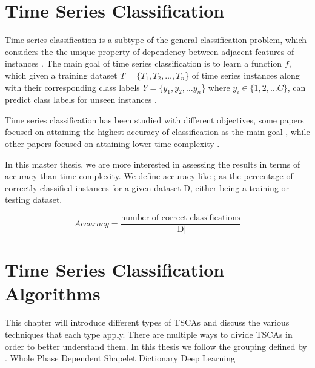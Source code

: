 \section{Time Series Classification}
\label{TimeSeriesClassification}
Time series classification is a subtype of the general classification problem, which considers the the unique property of dependency between adjacent features of instances \cite{Bostrom2017}.
The main goal of time series classification is to learn a function $f$,
which given a training dataset $T = \{T_{1},T_{2}, \ldots ,T_{n}$\} of time series instances
along with their corresponding class labels $Y=\{y_{1},y_{2}, \ldots y_{n}$\} where $y_{i} \in \{1,2, \ldots C\}$,
can predict class labels for unseen instances \cite{deng2013time}.

Time series classification has been studied with different objectives, some papers focused on attaining the highest accuracy of classification as the main goal \cite{kate2016using,jeong2011weighted,bostrom2017shapelet,lines2018time,schafer2017multivariate,fawaz2020inceptiontime},
while other papers focused on attaining lower time complexity \cite{ratanamahatana2004making,bagnall2017great,tan2020fastee,petitjean2016faster,schafer2017fast}.

In this master thesis, we are more interested in assessing the results in terms of accuracy than time complexity. We define accuracy like \cite{schafer2020teaser}; 
as the percentage of correctly classified instances for a given dataset D, either being a training or testing dataset.
\begin{definition}
    \[ \textstyle Accuracy = \frac{ \text{number of correct classifications}}{|\text{D}|} \]
\end{definition}

\section{Time Series Classification Algorithms}
\label{SectionTSCA}
This chapter will introduce different types of TSCAs and discuss the various techniques that each type apply.
There are multiple ways to divide TSCAs in order to better understand them.
In this thesis we follow the grouping defined by \cite{bagnall2017great}.
{Whole}
{Phase Dependent}
{Shapelet}
{Dictionary}
{Deep Learning}

